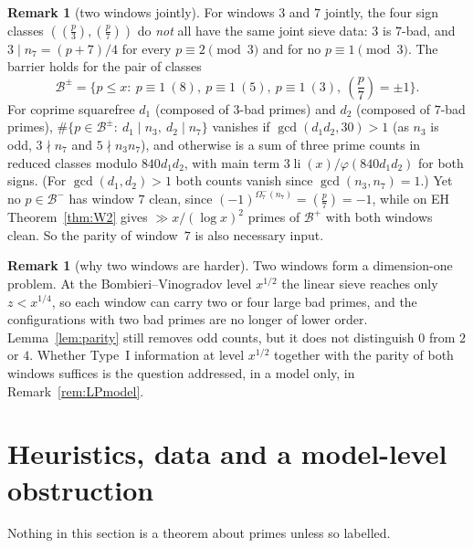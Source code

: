 \documentclass[11pt,reqno]{amsart}
\theoremstyle{definition}
\newtheorem{remark}[theorem]{Remark}
\newcommand{\li}{\operatorname{li}}
\newcommand{\leg}[2]{\left(\frac{#1}{#2}\right)}
\begin{document}
\begin{remark}[two windows jointly]\label{rem:P1joint}
For windows $3$ and $7$ jointly, the four sign classes
$(\leg p3,\leg p7)$ do \emph{not} all have the same joint sieve data:
$3$ is $7$-bad, and $3\mid n_7=(p+7)/4$ for every $p\equiv2\pmod3$ and for
no $p\equiv1\pmod3$.  The barrier holds for the pair of classes
\[
 \mathcal B^\pm=\{p\le x:\ p\equiv1\ (8),\ p\equiv1\ (5),\ p\equiv1\ (3),\ \leg p7=\pm1\}.
\]
For coprime squarefree $d_1$ (composed of $3$-bad primes) and $d_2$
(composed of $7$-bad primes), $\#\{p\in\mathcal B^\pm:\ d_1\mid n_3,\ d_2\mid n_7\}$
vanishes if $\gcd(d_1d_2,30)>1$ (as $n_3$ is odd, $3\nmid n_7$ and
$5\nmid n_3n_7$), and otherwise is a sum of three prime counts in
reduced classes modulo $840d_1d_2$, with main term
$3\li(x)/\varphi(840d_1d_2)$ for both signs.  (For $\gcd(d_1,d_2)>1$ both
counts vanish since $\gcd(n_3,n_7)=1$.)  Yet no $p\in\mathcal B^-$ has
window $7$ clean, since $(-1)^{\Omega_7^-(n_7)}=\leg p7=-1$, while on EH
Theorem~\ref{thm:W2} gives $\gg x/(\log x)^2$ primes of $\mathcal B^+$ with
both windows clean.  So the parity of window~$7$ is also necessary input.
\end{remark}

\begin{remark}[why two windows are harder]\label{rem:whytwo}
Two windows form a dimension-one problem.  At the
Bombieri--Vinogradov level $x^{1/2}$ the linear sieve reaches only
$z<x^{1/4}$, so each window can carry two or four large bad primes, and
the configurations with two bad primes are no longer of lower order.
Lemma~\ref{lem:parity} still removes odd counts, but it does not
distinguish $0$ from $2$ or $4$.  Whether Type~I information at level
$x^{1/2}$ together with the parity of both windows suffices is the
question addressed, in a model only, in Remark~\ref{rem:LPmodel}.
\end{remark}

\section{Heuristics, data and a model-level obstruction}\label{sec:model}

Nothing in this section is a theorem about primes unless so labelled.
\end{document}
